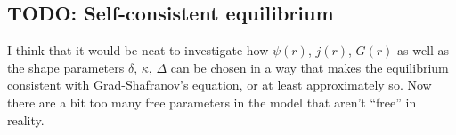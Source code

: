 \documentclass[11pt,a4paper]{article}
\newcommand{\rd}{\ensuremath{\mathrm{d}}}
\renewcommand{\b}[1]{\ensuremath{ {\bf #1 } }}
\begin{document}



\subsection{TODO: Self-consistent equilibrium}
I think that it would be neat to investigate how $\psi(r)$, $j(r)$, $G(r)$ as well as the shape parameters $\delta$, $\kappa$, $\Delta$ can be chosen in a way that makes the equilibrium consistent with Grad-Shafranov's equation, or at least approximately so. Now there are a bit too many free parameters in the model that aren't ``free'' in reality. %
\end{document}
